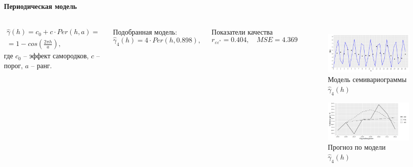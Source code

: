 \documentclass[notheorems]{beamer}
\theoremstyle{definition}
\theoremstyle{example}
\theoremstyle{plain}
\begin{document}
\begin{frame}
  \frametitle{\large\subsecname}
  \framesubtitle{Периодическая модель}
  \begin{columns}[c]
  {\footnotesize
  \begin{eqnarray}
  \label{eq:per}
    \widehat{\gamma}(h) = c_0 + c \cdot Per(h, a) = \nonumber \\
    = 1 - cos(\frac{2 \pi h}{a}),
  \end{eqnarray}
  где $ c_0 $ -- эффект самородков, $ c $ -- порог, $ a $ -- ранг.

  \vspace{0.5em}

  Подобранная модель:
  \begin{equation}
  \label{eq:gamma6}
    \widehat{\gamma}_4(h) = 4 \cdot Per(h, 0.898),
  \end{equation}

  Показатели качества
  \begin{equation*}
    r_{\varepsilon\varepsilon^{*}} = 0.404, \quad MSE = 4.369
  \end{equation*}
  }

  \vspace{-14.5pt}
  \begin{figure}[H]
    \includegraphics[width=0.9\linewidth]{../../figures/variogram/per-fit-cv-modeled.png} \\
    \caption{Модель семивариограммы $\widehat{\gamma}_4(h)$}
    \includegraphics[width=0.9\linewidth]{../../figures/variogram/per-fit-cv-cross-prediction.png}
    \caption{Прогноз по модели $\widehat{\gamma}_4(h)$}
  \end{figure}
  \end{columns}
\end{frame}
\end{document}
